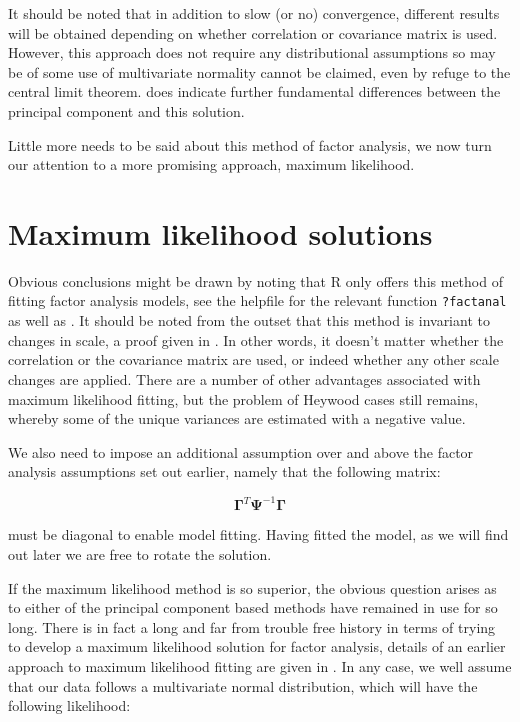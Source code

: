 It should be noted that in addition to slow (or no) convergence, different results will be obtained depending on whether correlation or covariance matrix is used.  However, this approach does not require any distributional assumptions so may be of some use of multivariate normality cannot be claimed, even by refuge to the central limit theorem.   \cite{Harmon:1967} does indicate further fundamental differences between the principal component and this solution.

Little more needs to be said about this method of factor analysis, we now turn our attention to a more promising approach, maximum likelihood.


\section{Maximum likelihood solutions}
\label{mlfact}

Obvious conclusions might be drawn by noting that R only offers this method of fitting factor analysis models, see the helpfile for the relevant function \texttt{?factanal} as well as \cite{Venables+Ripley:2002}.   It should be noted from the outset that this method is invariant to changes in scale, a proof given in \cite{Seber:1984}.   In other words, it doesn't matter whether the correlation or the covariance matrix are used, or indeed whether any other scale changes are applied.   There are a number of other advantages associated with maximum likelihood fitting, but the problem of Heywood cases still remains, whereby some of the unique variances are estimated with a negative value.   

We also need to impose an additional assumption over and above the factor analysis assumptions set out earlier, namely that the following matrix:

\begin{equation}
\label{diagconstraint}
\boldsymbol{\Gamma}^{T} \boldsymbol{\Psi}^{-1} \boldsymbol{\Gamma}
\end{equation}

must be diagonal to enable model fitting.   Having fitted the model, as we will find out later we are free to rotate the solution.


If the maximum likelihood method is so superior, the obvious question arises as to either of the principal component based methods have remained in use for so long.   There is in fact a long and far from trouble free history in terms of trying to develop a maximum likelihood solution for factor analysis, details of an earlier approach to maximum likelihood fitting are given in \cite{Morrison:1976}.   In any case, we well assume that our data follows a multivariate normal distribution, which will have the following likelihood:

